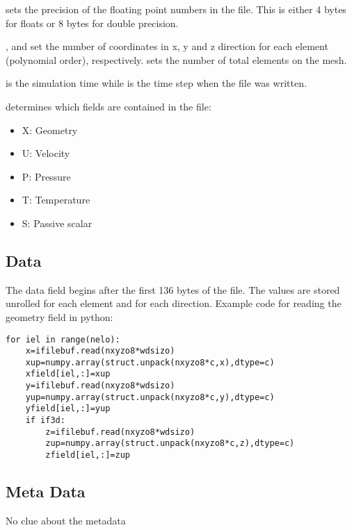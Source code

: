 \begin{center}
\end{center}

 sets the precision of the floating point numbers in the file. This
is either 4 bytes for floats or 8 bytes for double precision.

,  and  set the number of coordinates in  x, y and z
direction for each element (polynomial order), respectively.  sets
the number of total elements on the mesh.

 is the simulation time while  is the time step when the file was written.

 determines which fields are contained in the file:
\begin{itemize}
  \item X: Geometry
  \item U: Velocity
  \item P: Pressure
  \item T: Temperature
  \item S: Passive scalar
\end{itemize}

\subsection{Data}
The data field begins after the first 136 bytes of the file. The values are
stored unrolled for each element and for each direction.
Example code for reading the geometry field in python:
\begin{lstlisting}
for iel in range(nelo):
    x=ifilebuf.read(nxyzo8*wdsizo)
    xup=numpy.array(struct.unpack(nxyzo8*c,x),dtype=c)
    xfield[iel,:]=xup
    y=ifilebuf.read(nxyzo8*wdsizo)
    yup=numpy.array(struct.unpack(nxyzo8*c,y),dtype=c)
    yfield[iel,:]=yup
    if if3d:
        z=ifilebuf.read(nxyzo8*wdsizo)
        zup=numpy.array(struct.unpack(nxyzo8*c,z),dtype=c)    
        zfield[iel,:]=zup
\end{lstlisting}

\subsection{Meta Data}
{\color{red} No clue about the metadata}
